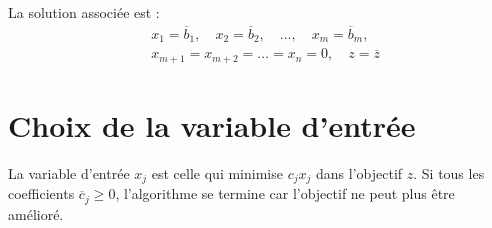 \documentclass{report}
\begin{document}
\begin{multicols*}{2}
\begin{table}[H]
    \centering
    \renewcommand{\arraystretch}{1.5}
    \selectfont
    \footnotesize
\end{table}

La solution associée est :
\begin{align*}
    &x_1 = \overline{b}_1,\quad x_2 = \overline{b}_2,\quad \dots,\quad
    x_m = \overline{b}_m, \\
    &x_{m+1} = x_{m+2} = \dots = x_n = 0,\quad z = \overline{z}
\end{align*}

\section{Choix de la variable d'entrée}

La variable d'entrée $x_j$ est celle qui minimise $c_j x_j$ dans l'objectif $z$.
Si tous les coefficients $\overline{c}_j \geq 0$, l'algorithme se termine car l'objectif
ne peut plus être amélioré.


\end{multicols*}
\end{document}
